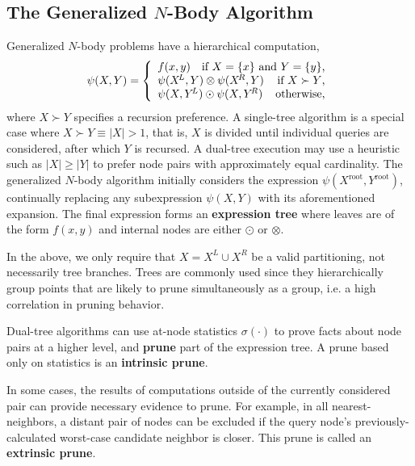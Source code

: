 \documentclass[twoside,leqno,twocolumn]{article}
\newcommand{\union}{\cup}
\newcommand{\prefsplit}[2]{#1 \succ #2}
\newcommand{\gnp}{\psi}
\newcommand{\mysub}[1]{\subsection{#1} }
\newcommand{\defterm}[1]{{\bf #1}}
\newcommand{\kdroot}[1]{#1^{\text{root}}}
\newcommand{\kdleft}[1]{#1^{\!L}}
\newcommand{\kdright}[1]{#1^{\!R}}
\newcommand{\outstat}{\sigma}
\begin{document}
\mysub{The Generalized $N$-Body Algorithm}
Generalized $N$-body problems have a hierarchical computation,
\[
\gnp(X,Y) = \left\{ \begin{array}{lrr}
    f(x,y) & \multicolumn{2}{r}{\text{if }X = \{x\}\text{ and }Y = \{y\}\text{,}}
    \\
    \multicolumn{2}{l}{\gnp(\kdleft{X},Y) \otimes \gnp(\kdright{X}, Y)} & \text{if }\prefsplit{X}{Y}\text{,}
    \\
    \multicolumn{2}{l}{\gnp(X,\kdleft{Y}) \odot \gnp(X,\kdright{Y})} & \text{otherwise,}
  \end{array}
\right.
\]
\noindent
where $\prefsplit{X}{Y}$ specifies a recursion preference.
A single-tree algorithm is a special case where $\prefsplit{X}{Y} \equiv |X| > 1$, that is, $X$ is divided until individual queries are considered, after which $Y$ is recursed.
A dual-tree execution may use a heuristic such as $|X| \geq |Y|$ to prefer node pairs with approximately equal cardinality.
The generalized $N$-body algorithm initially considers the expression $\gnp(\kdroot{X}, \kdroot{Y})$, continually replacing any subexpression $\gnp(X, Y)$ with its aforementioned expansion.
The final expression forms an \defterm{expression tree} where leaves are of the form $f(x,y)$ and internal nodes are either $\odot$ or $\otimes$.

In the above, we only require that $X = \kdleft{X} \union \kdright{X}$ be a valid partitioning, not necessarily tree branches.
Trees are commonly used since they hierarchically group points that are likely to prune simultaneously as a group, i.e. a high correlation in pruning behavior.

Dual-tree algorithms can use at-node statistics $\outstat(\cdot)$ to prove facts about node pairs at a higher level, and \defterm{prune} part of the expression tree.
A prune based only on statistics is an \defterm{intrinsic prune}.

In some cases, the results of computations outside of the currently considered pair can provide necessary evidence to prune.
For example, in all nearest-neighbors, a distant pair of nodes can be excluded if the query node's previously-calculated worst-case candidate neighbor is closer.
This prune is called an \defterm{extrinsic prune}.
\end{document}
